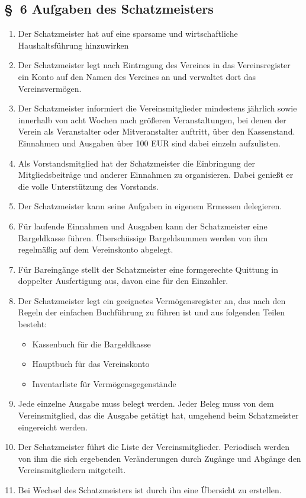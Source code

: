 \documentclass[10pt,a4paper]{article}
\begin{document}
\subsection*{\S \ 6 Aufgaben des Schatzmeisters}
\begin{enumerate}
\item Der Schatzmeister hat auf eine sparsame und wirtschaftliche
	Haushaltsf{\"u}hrung hinzuwirken
\item Der Schatzmeister legt nach Eintragung des Vereines in das Vereinsregister
	ein Konto auf den Namen des Vereines an und verwaltet dort das
	Vereinsverm{\"o}gen.
\item Der Schatzmeister informiert die Vereinsmitglieder mindestens
    j{\"a}hrlich sowie innerhalb von acht Wochen nach gr{\"o}{\ss}eren
	Veranstaltungen, bei denen der Verein als Veranstalter oder
	Mitveranstalter auftritt, {\"u}ber den Kassenstand. Einnahmen und
	Ausgaben {\"u}ber 100 EUR sind dabei einzeln aufzulisten.
\item Als Vorstandsmitglied hat der Schatzmeister die Einbringung der
	Mitgliedsbeitr{\"a}ge und anderer Einnahmen zu organisieren. Dabei
	genie{\ss}t er die volle Unterst{\"u}tzung des Vorstands.
\item Der Schatzmeister kann seine Aufgaben in eigenem Ermessen delegieren.
\item F{\"u}r laufende Einnahmen und Ausgaben kann der Schatzmeister eine
    Bargeldkasse f{\"u}hren. {\"U}ber\-sch{\"u}s\-sige Bargeldsummen werden von ihm
	regelm{\"a}{\ss}ig auf dem Vereinskonto abgelegt.
\item F{\"u}r Bareing{\"a}nge stellt der Schatzmeister eine formgerechte Quittung
	in doppelter Ausfertigung aus, davon eine f{\"u}r den Einzahler.
\item Der Schatzmeister legt ein geeignetes Verm{\"o}gensregister an, das
	nach den Regeln der einfachen Buchf{\"u}hrung zu f{\"u}hren ist und aus
	folgenden Teilen besteht:
	\begin{itemize}
	\item Kassenbuch f{\"u}r die Bargeldkasse
	\item Hauptbuch f{\"u}r das Vereinskonto
	\item Inventarliste f{\"u}r Verm{\"o}gensgegenst{\"a}nde 
	\end{itemize}
\item Jede einzelne Ausgabe muss belegt werden. Jeder Beleg muss von
	dem Vereinsmitglied, das die Ausgabe get{\"a}tigt hat, umgehend
	beim Schatzmeister eingereicht werden.
\item Der Schatzmeister f{\"u}hrt die Liste der Vereinsmitglieder.
	Periodisch werden von ihm die sich ergebenden Ver{\"a}nderungen
	durch Zug{\"a}nge und Abg{\"a}nge den Vereinsmitgliedern mitgeteilt.
\item Bei Wechsel des Schatzmeisters ist durch ihn eine {\"U}bersicht zu erstellen.
\end{enumerate}
%
%
\end{document}

